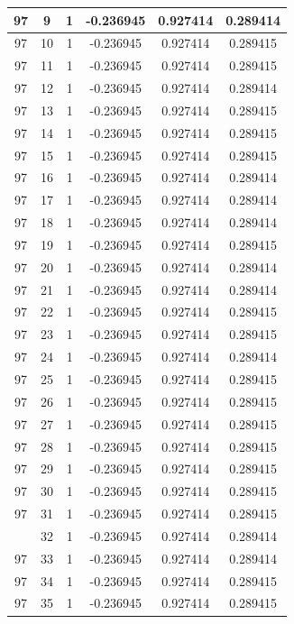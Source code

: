 \documentclass[12pt,a4paper]{article}
\numberwithin{equation}{section}
\numberwithin{figure}{section}
\numberwithin{table}{section}
\begin{document}
\begin{longtable}{|c|c|c|c|c|c|}
97 & 9 & 1 & -0.236945 & 0.927414 & 0.289414 \\ \hline
97 & 10 & 1 & -0.236945 & 0.927414 & 0.289415 \\ \hline
97 & 11 & 1 & -0.236945 & 0.927414 & 0.289415 \\ \hline
97 & 12 & 1 & -0.236945 & 0.927414 & 0.289414 \\ \hline
97 & 13 & 1 & -0.236945 & 0.927414 & 0.289415 \\ \hline
97 & 14 & 1 & -0.236945 & 0.927414 & 0.289415 \\ \hline
97 & 15 & 1 & -0.236945 & 0.927414 & 0.289415 \\ \hline
97 & 16 & 1 & -0.236945 & 0.927414 & 0.289414 \\ \hline
97 & 17 & 1 & -0.236945 & 0.927414 & 0.289414 \\ \hline
97 & 18 & 1 & -0.236945 & 0.927414 & 0.289414 \\ \hline
97 & 19 & 1 & -0.236945 & 0.927414 & 0.289415 \\ \hline
97 & 20 & 1 & -0.236945 & 0.927414 & 0.289414 \\ \hline
97 & 21 & 1 & -0.236945 & 0.927414 & 0.289414 \\ \hline
97 & 22 & 1 & -0.236945 & 0.927414 & 0.289415 \\ \hline
97 & 23 & 1 & -0.236945 & 0.927414 & 0.289415 \\ \hline
97 & 24 & 1 & -0.236945 & 0.927414 & 0.289414 \\ \hline
97 & 25 & 1 & -0.236945 & 0.927414 & 0.289415 \\ \hline
97 & 26 & 1 & -0.236945 & 0.927414 & 0.289415 \\ \hline
97 & 27 & 1 & -0.236945 & 0.927414 & 0.289415 \\ \hline
97 & 28 & 1 & -0.236945 & 0.927414 & 0.289415 \\ \hline
97 & 29 & 1 & -0.236945 & 0.927414 & 0.289415 \\ \hline
97 & 30 & 1 & -0.236945 & 0.927414 & 0.289415 \\ \hline
97 & 31 & 1 & -0.236945 & 0.927414 & 0.289415 \\ \hline
\pagebreak
97 & 32 & 1 & -0.236945 & 0.927414 & 0.289414 \\ \hline
97 & 33 & 1 & -0.236945 & 0.927414 & 0.289414 \\ \hline
97 & 34 & 1 & -0.236945 & 0.927414 & 0.289415 \\ \hline
97 & 35 & 1 & -0.236945 & 0.927414 & 0.289415 \\ \hline

\end{longtable}
\end{document}
